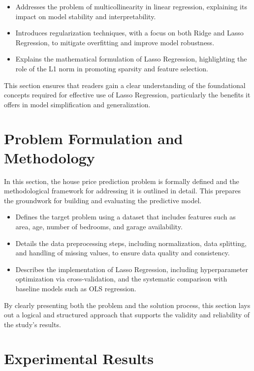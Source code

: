 \documentclass[12pt, a4paper]{report}
\begin{document}
\begin{itemize}
    \item Addresses the problem of multicollinearity in linear regression, explaining its impact on model stability and interpretability.

 \item Introduces regularization techniques, with a focus on both Ridge and Lasso Regression, to mitigate overfitting and improve model robustness.

 \item Explains the mathematical formulation of Lasso Regression, highlighting the role of the L1 norm in promoting sparsity and feature selection.
\end{itemize}

This section ensures that readers gain a clear understanding of the foundational concepts required for effective use of Lasso Regression, particularly the benefits it offers in model simplification and generalization.

\section*{Problem Formulation and Methodology}

In this section, the house price prediction problem is formally defined and the methodological framework for addressing it is outlined in detail. This prepares the groundwork for building and evaluating the predictive model.
\begin{itemize}
    \item Defines the target problem using a dataset that includes features such as area, age, number of bedrooms, and garage availability.

    \item Details the data preprocessing steps, including normalization, data splitting, and handling of missing values, to ensure data quality and consistency.
    \item Describes the implementation of Lasso Regression, including hyperparameter optimization via cross-validation, and the systematic comparison with baseline models such as OLS regression.
\end{itemize}

By clearly presenting both the problem and the solution process, this section lays out a logical and structured approach that supports the validity and reliability of the study’s results.

\section*{Experimental Results}
\end{document}

